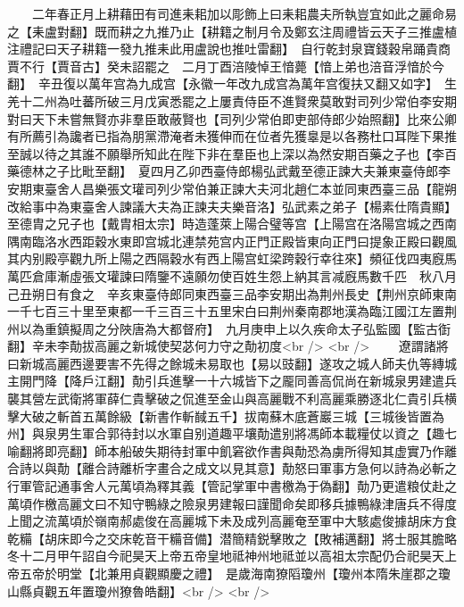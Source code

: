 　　二年春正月上耕藉田有司進耒耜加以彫飾上曰耒耜農夫所執豈宜如此之麗命易之【耒盧對翻】既而耕之九推乃止【耕籍之制月令及鄭玄注周禮皆云天子三推盧植注禮記曰天子耕籍一發九推耒此用盧說也推吐雷翻】　自行乾封泉寶錢穀帛踊貴商賈不行【賈音古】癸未詔罷之　二月丁酉涪陵悼王愔薨【愔上弟也涪音浮愔於今翻】　辛丑復以萬年宫為九成宫【永徽一年改九成宫為萬年宫復扶又翻又如字】　生羌十二州為吐蕃所破三月戊寅悉罷之上屢責侍臣不進賢衆莫敢對司列少常伯李安期對曰天下未嘗無賢亦非羣臣敢蔽賢也【司列少常伯即吏部侍郎少始照翻】比來公卿有所薦引為讒者已指為朋黨滯淹者未獲伸而在位者先獲辠是以各務杜口耳陛下果推至誠以待之其誰不願舉所知此在陛下非在羣臣也上深以為然安期百藥之子也【李百藥德林之子比毗至翻】　夏四月乙卯西臺侍郎楊弘武戴至德正諫大夫兼東臺侍郎李安期東臺舍人昌樂張文瓘司列少常伯兼正諫大夫河北趙仁本並同東西臺三品【龍朔改給事中為東臺舍人諫議大夫為正諫夫夫樂音洛】弘武素之弟子【楊素仕隋貴顯】至德胄之兄子也【戴胄相太宗】時造蓬萊上陽合璧等宫【上陽宫在洛陽宫城之西南隅南臨洛水西距穀水東即宫城北連禁苑宫内正門正殿皆東向正門曰提象正殿曰觀風其内别殿亭觀九所上陽之西隔穀水有西上陽宫虹梁跨穀行幸往來】頻征伐四夷廐馬萬匹倉庫漸虛張文瓘諫曰隋鑒不遠願勿使百姓生怨上納其言减廐馬數千匹　秋八月己丑朔日有食之　辛亥東臺侍郎同東西臺三品李安期出為荆州長史【荆州京師東南一千七百三十里至東都一千三百三十五里宋白曰荆州秦南郡地漢為臨江國江左置荆州以為重鎮擬周之分陜唐為大都督府】　九月庚申上以久疾命太子弘監國【監古衘翻】辛未李勣拔高麗之新城使契苾何力守之勣初度<br />
<br />
　　遼謂諸將曰新城高麗西邊要害不先得之餘城未易取也【易以豉翻】遂攻之城人師夫仇等縳城主開門降【降戶江翻】勣引兵進擊一十六城皆下之龎同善高侃尚在新城泉男建遣兵襲其營左武衛將軍薛仁貴擊破之侃進至金山與高麗戰不利高麗乘勝逐北仁貴引兵横擊大破之斬首五萬餘級【新書作斬馘五千】拔南蘇木底蒼巖三城【三城後皆置為州】與泉男生軍合郭待封以水軍自别道趣平壤勣遣别將馮師本載糧仗以資之【趣七喻翻將即亮翻】師本船破失期待封軍中飢窘欲作書與勣恐為虜所得知其虚實乃作離合詩以與勣【離合詩離析字畫合之成文以見其意】勣怒曰軍事方急何以詩為必斬之行軍管記通事舍人元萬頃為釋其義【管記掌軍中書檄為于偽翻】勣乃更遣粮仗赴之萬頃作檄高麗文曰不知守鴨綠之險泉男建報曰謹聞命矣即移兵據鴨綠津唐兵不得度上聞之流萬頃於嶺南郝處俊在高麗城下未及成列高麗奄至軍中大駭處俊據胡床方食乾糒【胡床即今之交床乾音干糒音備】潜簡精鋭擊敗之【敗補邁翻】將士服其膽略　冬十二月甲午詔自今祀昊天上帝五帝皇地祗神州地祗並以高祖太宗配仍合祀昊天上帝五帝於明堂【北兼用貞觀顯慶之禮】　是歲海南獠䧟瓊州【瓊州本隋朱崖郡之瓊山縣貞觀五年置瓊州獠魯皓翻】<br />
<br />
